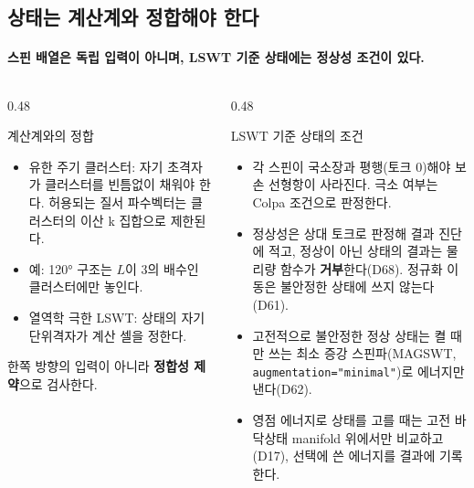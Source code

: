 \subsection{상태는 계산계와 정합해야 한다}\label{state-geometry}
\begingroup%
  \framesubtitle{스핀 배열은 독립 입력이 아니며, LSWT 기준 상태에는 정상성 조건이 있다.}
  \begin{columns}[T,onlytextwidth]
    \begin{column}{0.48\textwidth}
      \begin{block}{계산계와의 정합}
        \begin{itemize}
          \item 유한 주기 클러스터: 자기 초격자가 클러스터를 빈틈없이 채워야 한다.
            허용되는 질서 파수벡터는 클러스터의 이산 k 집합으로 제한된다.
          \item 예: 120° 구조는 $L$이 3의 배수인 클러스터에만 놓인다.
          \item 열역학 극한 LSWT: 상태의 자기 단위격자가 계산 셀을 정한다.
        \end{itemize}
      \end{block}
      \smallskip
      한쪽 방향의 입력이 아니라 \textbf{정합성 제약}으로 검사한다.
    \end{column}
    \begin{column}{0.48\textwidth}
      \begin{block}{LSWT 기준 상태의 조건}
        \begin{itemize}
          \item 각 스핀이 국소장과 평행(토크 0)해야 보손 선형항이 사라진다.
            극소 여부는 Colpa 조건으로 판정한다.
          \item 정상성은 상대 토크로 판정해 결과 진단에 적고, 정상이 아닌 상태의 결과는
            물리량 함수가 \textbf{거부}한다(D68). 정규화 이동은 불안정한 상태에 쓰지 않는다(D61).
          \item 고전적으로 불안정한 정상 상태는 켤 때만 쓰는 최소 증강 스핀파(MAGSWT,
            \texttt{augmentation="minimal"})로 에너지만 낸다(D62).
          \item 영점 에너지로 상태를 고를 때는 고전 바닥상태 manifold 위에서만 비교하고(D17),
            선택에 쓴 에너지를 결과에 기록한다.
        \end{itemize}
      \end{block}
    \end{column}
  \end{columns}
  \par\medskip
\endgroup

